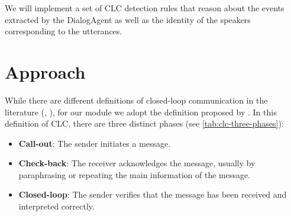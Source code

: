 We will implement a set of CLC detection rules that reason about the events
extracted by the DialogAgent as well as the identity of the speakers
corresponding to the utterances.


\section{Approach}

While there are different definitions of closed-loop communication in the
literature (\citet{abd2018closed}, \citet{yee2017role}), for our module we
adopt the definition proposed by \citet{Hargestam.ea:2013}.  In this definition
of CLC, there are three distinct phases (see \autoref{tab:clc-three-phases}): 

\begin{itemize}

    \item \textbf{Call-out}: The sender initiates a message.

    \item \textbf{Check-back}: The receiver acknowledges the message, usually
        by paraphrasing or repeating the main information of the message.

    \item \textbf{Closed-loop}: The sender verifies that the message has been
                received and interpreted correctly.

\end{itemize}

\newcommand{\utteranceone}{\textit{This is Green. I’m finishing this side, blue, could you check the central for victims? }} 
\newcommand{\utterancetwo}{\textit{This is Blue. Okay. I’ll go check the central for victims.}}
\newcommand{\utterancethree}{\textit{All right, thank you, Blue.}}

